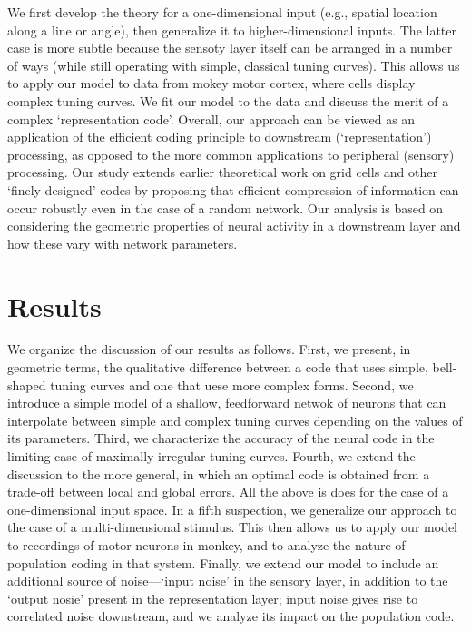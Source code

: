 \documentclass[a4paper]{article}%
\begin{document}
We first develop the theory for a one-dimensional input (e.g., spatial
location along a line or angle), then generalize it to higher-dimensional
inputs. The latter case is more subtle because the sensoty layer itself can be
arranged in a number of ways (while still operating with simple, classical
tuning curves). This allows us to apply our model to data from mokey motor
cortex, where cells display complex tuning curves. We fit our model to the
data and discuss the merit of a complex `representation code'. Overall, our
approach can be viewed as an application of the efficient coding principle to
downstream (`representation') processing, as opposed to the more common
applications to peripheral (sensory) processing. Our study extends earlier
theoretical work on grid cells and other `finely designed' codes by proposing
that efficient compression of information can occur robustly even in the case
of a random network. Our analysis is based on considering the geometric
properties of neural activity in a downstream layer and how these vary with
network parameters.

\section{Results}

 We organize the discussion of our
results as follows. First, we present, in geometric terms, the qualitative
difference between a code that uses simple, bell-shaped tuning curves and one
that uese more complex forms. Second, we introduce a simple model of a
shallow, feedforward netwok of neurons that can interpolate between simple and
complex tuning curves depending on the values of its parameters. Third, we
characterize the accuracy of the neural code in the limiting case of maximally
irregular tuning curves. Fourth, we extend the discussion to the more general,
in which an optimal code is obtained from a trade-off between local and global
errors. All the above is does for the case of a one-dimensional input space.
In a fifth suspection, we generalize our approach to the case of a
multi-dimensional stimulus. This then allows us to apply our model to
recordings of motor neurons in monkey, and to analyze the nature of population
coding in that system. Finally, we extend our model to include an additional
source of noise---`input noise' in the sensory layer, in addition to the
`output nosie' present in the representation layer; input noise gives rise to
correlated noise downstream, and we analyze its impact on the population code.
\end{document}
